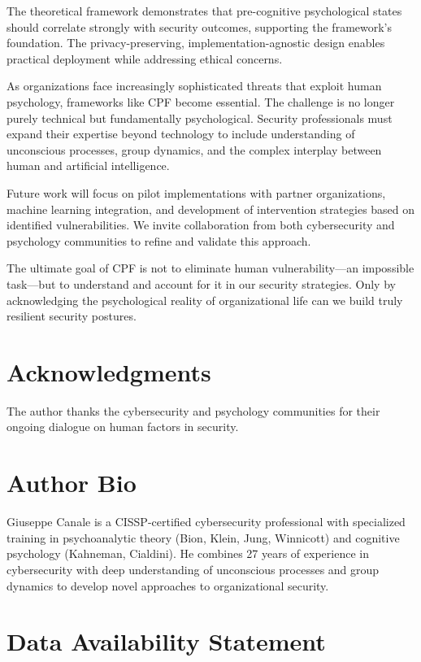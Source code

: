 \documentclass[11pt,a4paper]{article}
\begin{document}
The theoretical framework demonstrates that pre-cognitive psychological states should correlate strongly with security outcomes, supporting the framework's foundation. The privacy-preserving, implementation-agnostic design enables practical deployment while addressing ethical concerns.

As organizations face increasingly sophisticated threats that exploit human psychology, frameworks like CPF become essential. The challenge is no longer purely technical but fundamentally psychological. Security professionals must expand their expertise beyond technology to include understanding of unconscious processes, group dynamics, and the complex interplay between human and artificial intelligence.

Future work will focus on pilot implementations with partner organizations, machine learning integration, and development of intervention strategies based on identified vulnerabilities. We invite collaboration from both cybersecurity and psychology communities to refine and validate this approach.

The ultimate goal of CPF is not to eliminate human vulnerability---an impossible task---but to understand and account for it in our security strategies. Only by acknowledging the psychological reality of organizational life can we build truly resilient security postures.

\section*{Acknowledgments}

The author thanks the cybersecurity and psychology communities for their ongoing dialogue on human factors in security.

\section*{Author Bio}

Giuseppe Canale is a CISSP-certified cybersecurity professional with 
specialized training in psychoanalytic theory (Bion, Klein, Jung, 
Winnicott) and cognitive psychology (Kahneman, Cialdini). He combines 
27 years of experience in cybersecurity with deep understanding of 
unconscious processes and group dynamics to develop novel approaches 
to organizational security.

\section*{Data Availability Statement}
\end{document}

